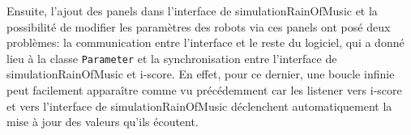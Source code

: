 Ensuite, l'ajout des panels dans l'interface de simulationRainOfMusic et la possibilité de modifier les paramètres des robots via ces panels ont posé deux problèmes: la communication entre l'interface et le reste du logiciel, qui a donné lieu à la classe \verb|Parameter| et la synchronisation entre l'interface de simulationRainOfMusic et i-score. En effet, pour ce dernier, une boucle infinie peut facilement apparaître comme vu précédemment car les listener vers i-score et vers l'interface de simulationRainOfMusic déclenchent automatiquement la mise à jour des valeurs qu'ils écoutent. 

